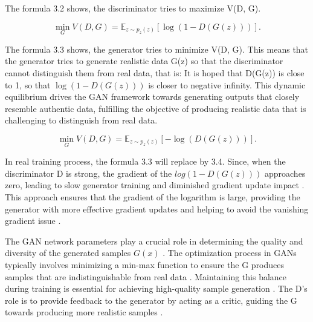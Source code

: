 The formula 3.2 shows, the discriminator tries to maximize V(D, G).

\begin{equation}
    \min_{G} V(D, G) = \mathbb{E}_{z \sim p_{z}(z)} [\log(1 - D(G(z)))].
\end{equation}


The formula 3.3 shows, the generator tries to minimize V(D, G). 
This means that the generator tries to generate realistic data G(z) so that the discriminator cannot distinguish 
them from real data, that is: It is hoped that D(G(z)) is close to 1, so that $\log (1 - D(G(z)))$ is closer to negative infinity.
This dynamic equilibrium drives the GAN framework towards generating outputs that closely resemble authentic data, 
fulfilling the objective of producing realistic data that is challenging to distinguish from real data.


\begin{equation}
    \min_{G} V(D, G) = \mathbb{E}_{z \sim p_{z}(z)} [-\log(D(G(z)))].
\end{equation}

In real training process, the formula 3.3 will replace by 3.4. Since, when the discriminator D is strong, 
the gradient of the $log(1 - D(G(z)))$ approaches zero, leading to slow generator training and diminished gradient update impact \citep{10.1007/s11263-019-01265-2}.  
This approach ensures that the gradient of the logarithm is large, providing the generator with more effective gradient updates and 
helping to avoid the vanishing gradient issue \citep{10.1109/tpami.2018.2872043}.



The GAN network parameters play a crucial role in determining the quality and diversity of 
the generated samples $G(x)$ \citep{10.1007/s10928-021-09787-4}. The optimization process in GANs 
typically involves minimizing a min-max function to ensure the G produces samples that 
are indistinguishable from real data \citep{10.1109/taslp.2017.2761547}. Maintaining this balance 
during training is essential for achieving high-quality sample generation \citep{10.1007/s10928-021-09787-4}. 
The D's role is to provide feedback to the generator by acting as a critic, 
guiding the G towards producing more realistic samples \citep{10.48550/arxiv.1802.05637}.
